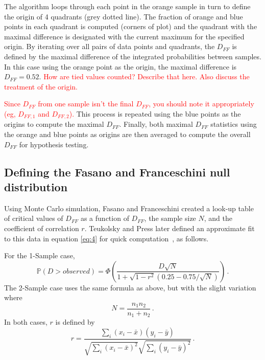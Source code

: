 \documentclass[codesnippet]{jss}
\newcommand{\RBnote}[1]{\textcolor{red}{#1}}
\begin{document}
The algorithm loops through each point in the orange sample in turn to define the origin of 4 quadrants (grey dotted line). The fraction of orange and blue points in each quadrant is computed (corners of plot) and the quadrant with the maximal difference is designated with the current maximum for the specified origin. By iterating over all pairs of data points and quadrants, the $D_{FF}$ is defined by the maximal difference of the integrated probabilities between samples. In this case using the orange point as the origin, the maximal difference is $D_{FF} = 0.52$.
\RBnote{How are tied values counted? Describe that here.  Also discuss the treatment of the origin.}

\RBnote{Since $D_{FF}$ from one sample isn't the final $D_{FF}$, you should note it appropriately (eg, $D_{FF,1}$ and $D_{FF,2}$).}
This process is repeated using the blue points as the origins to compute the maximal $D_{FF}$. Finally, both maximal $D_{FF}$ statistics using the orange and blue points as origins are then averaged to compute the overall $D_{FF}$ for hypothesis testing.

\subsection{Defining the Fasano and Franceschini null distribution}

Using Monte Carlo simulation, Fasano and Franceschini created a look-up table of critical values of $D_{FF}$ as a function of $D_{FF}$, the sample size $N$, and the coefficient of correlation $r$. Teukolsky and Press later defined an approximate fit to this data in equation \ref{eq:4} for quick computation~\cite{numericalRecipes}, as follows.

For the 1-Sample case,
\begin{equation} \label{eq:4}
\mathbb{P}(D > observed) = \Phi \left( \frac{D\sqrt{N}}{1+\sqrt{1-r^2}(0.25-0.75/\sqrt{N})} \right) \, .
\end{equation}
The 2-Sample case uses the same formula as above, but with the slight variation where
\begin{equation} \label{eq:5}
N = \frac{n_1n_2}{n_1+n_2}\, .
\end{equation}
In both cases, $r$ is defined by
\begin{equation} \label{eq:6}
r = \frac{\sum_{i}^{}(x_i-\bar{x})(y_i-\bar{y})}{\sqrt{\sum_{i}^{}(x_i-\bar{x})^2}\sqrt{\sum_{i}^{}(y_i-\bar{y})^2}}\, .
\end{equation}
\end{document}
